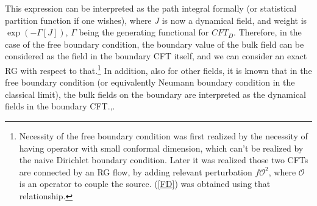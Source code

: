 \documentclass[12pt,epsbox]{article}
\numberwithin{equation}{section}
\begin{document}
This expression can be interpreted as the path integral formally (or statistical partition function if one wishes), where $J$ is now a dynamical field, and weight is $\exp(-\Gamma[J])$, $\Gamma$ being the generating functional for $CFT_D$. Therefore, in the case of the free boundary condition, the boundary value of the bulk field can be considered as the field in the boundary CFT itself, and we can consider an exact RG with respect to that.\footnote{Necessity of the free boundary condition was first realized by the necessity of having operator with small conformal dimension, which can't be realized by the naive Dirichlet boundary condition. Later it was realized those two CFTs are connected by an RG flow, by adding relevant perturbation $f \mathcal{O}^2$, where $\mathcal{O}$ is an operator to couple the source. (\ref{FD}) was obtained using that relationship.} In addition, also for other fields, it is known that in the free boundary condition (or equivalently Neumann boundary condition in the classical limit), the bulk fields on the boundary are interpreted as the dynamical fields in the boundary CFT.\cite{MukundOfer},\cite{Ross}.
\end{document}
